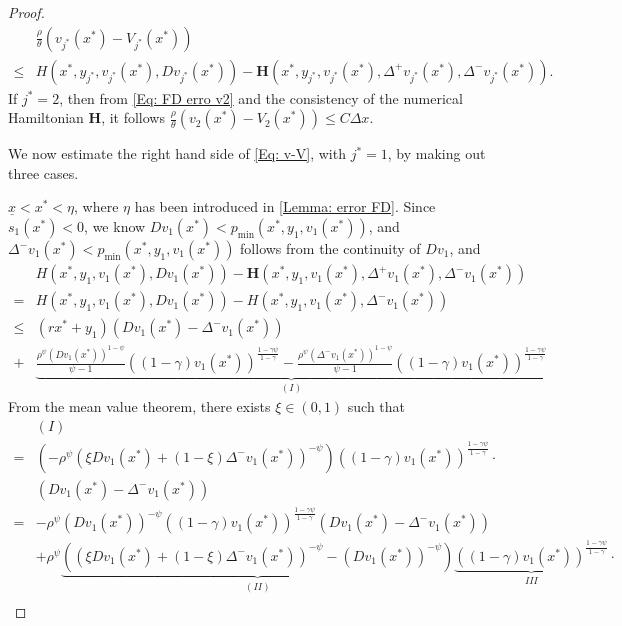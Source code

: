 \documentclass[11pt]{article}
\numberwithin{equation}{section}
\numberwithin{algorithm}{section}
\newcommand{\lc}{\left(}
\newcommand{\rc}{\right)}
\newcommand{\ux}{{\underline x}}
\newcommand{\beq}{\begin{equation}}
\newcommand{\eeq}{\end{equation}}
\newcommand{\g}{\gamma}
\newcommand{\p}{\psi}
\theoremstyle{plain}
\newcommand{\D}{\Delta}
\begin{document}
\begin{proof}
\beq\label{Eq: v-V}
\begin{aligned}
&\frac{\rho}{\theta}\lc v_{j^*}(x^*)-V_{j^*}(x^*)\rc \\
\leq {}& H\lc x^*,y_{j^*},v_{j^*}(x^*),Dv_{j^*}(x^*)\rc-\boldsymbol{H}\lc x^*,y_{j^*},v_{j^*}(x^*),\D^+{v_{j^*}(x^*)},\D^-{v_{j^*}(x^*)}\rc.
\end{aligned}
\eeq
If $j^*=2$, then from \cref{Eq: FD erro v2} and the consistency of the numerical Hamiltonian $\boldsymbol{H}$, it follows $\frac{\rho}{\theta}\lc v_{2}(x^*)-V_{2}(x^*)\rc\leq C\D x$.\par 
We now estimate the right hand side of \cref{Eq: v-V}, with $j^*=1$, by making out three cases. \par 
{} $\ux<x^*<\eta$, where $\eta$ has been introduced in \cref{Lemma: error FD}.
Since $s_1(x^*)<0$, we know $Dv_{1}(x^*)<p_{\min}\lc x^*,y_{1},v_{1}(x^*)\rc$, and $\D^-{v_{1}(x^*)}<p_{\min}\lc x^*,y_{1},v_{1}(x^*)\rc$ follows from the continuity of $Dv_{1}$, and 
$$
\begin{aligned}
&H\lc x^*,y_{1},v_{1}(x^*),Dv_{1}(x^*)\rc-\boldsymbol{H}\lc x^*,y_{1},v_{1}(x^*),\D^+{v_{1}(x^*)},\D^-{v_{1}(x^*)}\rc \\
= {}& H\lc x^*,y_{1},v_{1}(x^*),Dv_{1}(x^*)\rc-H\lc x^*,y_{1},v_{1}(x^*),\D^-{v_{1}(x^*)}\rc\\
\leq {}& (rx^*+y_{1})\lc Dv_{1}(x^*)-\D^-{v_{1}(x^*)}\rc\\
+&\underbrace{\frac{\rho^{\p}\lc Dv_{1}(x^*)\rc^{1-\p}}{\p-1} ((1-\g){v_{1}(x^*)})^{\frac{1-\g \p}{1-\g}}-\frac{\rho^{\p} \lc \D^-{v_{1}(x^*)}\rc^{1-\p}}{\p-1}((1-\g){v_{1}(x^*)})^{\frac{1-\g \p}{1-\g}}}_{(I)}
\end{aligned}
$$
From the mean value theorem, there exists $\xi\in (0,1)$ such that 
$$
\begin{aligned}
&(I)\\
={}&\lc-\rho^{\p}\lc \xi Dv_{1}(x^*)+(1-\xi)\D^-{v_{1}(x^*)}\rc^{-\psi}\rc ((1-\g){v_{1}(x^*)})^{\frac{1-\g \p}{1-\g}}\cdot\\
&\lc Dv_{1}(x^*)-\D^-{v_{1}(x^*)}\rc\\
={}& -\rho^{\p}\lc Dv_{1}(x^*)\rc^{-\psi}((1-\g){v_{1}(x^*)})^{\frac{1-\g \p}{1-\g}} \lc Dv_{1}(x^*)-\D^-{v_{1}(x^*)}\rc\\
&+\rho^{\p}\underbrace{\lc\lc \xi Dv_{1}(x^*)+(1-\xi)\D^-{v_{1}(x^*)}\rc^{-\psi}-\lc Dv_{1}(x^*)\rc^{-\psi}\rc}_{(II)}\underbrace{((1-\g){v_{1}(x^*)})^{\frac{1-\g \p}{1-\g}}}_{III}\cdot\\

\end{aligned}$$
\end{proof}
\end{document}
